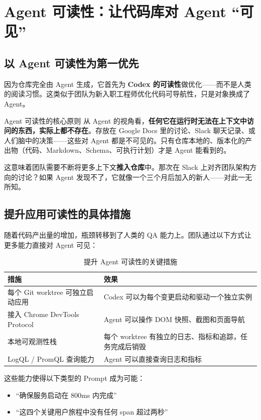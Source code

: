 \section{Agent 可读性：让代码库对 Agent ``可见''}

\subsection{以 Agent 可读性为第一优先}

因为仓库完全由 Agent 生成，它首先为 \textbf{Codex 的可读性}做优化——而不是人类的阅读习惯。这类似于团队为新入职工程师优化代码可导航性，只是对象换成了 Agent。

\begin{importantbox}{Agent 可读性的核心原则}
从 Agent 的视角看，\textbf{任何它在运行时无法在上下文中访问的东西，实际上都不存在}。存放在 Google Docs 里的讨论、Slack 聊天记录、或人们脑中的决策——这些对 Agent 都是不可见的。只有仓库本地的、版本化的产出物（代码、Markdown、Schema、可执行计划）才是 Agent 能看到的。
\end{importantbox}

这意味着团队需要不断将更多上下文\textbf{推入仓库}中。那次在 Slack 上对齐团队架构方向的讨论？如果 Agent 发现不了，它就像一个三个月后加入的新人——对此一无所知。

\subsection{提升应用可读性的具体措施}

随着代码产出量的增加，瓶颈转移到了人类的 QA 能力上。团队通过以下方式让更多能力直接对 Agent 可见：

\begin{table}[H]
\centering
\small
\begin{tabular}{p{4cm}p{9cm}}
\toprule
\textbf{措施} & \textbf{效果} \\
\midrule
每个 Git worktree 可独立启动应用 & Codex 可以为每个变更启动和驱动一个独立实例 \\
接入 Chrome DevTools Protocol & Agent 可以操作 DOM 快照、截图和页面导航 \\
本地可观测性栈 & 每个 worktree 有独立的日志、指标和追踪，任务完成后销毁 \\
LogQL / PromQL 查询能力 & Agent 可以直接查询日志和指标 \\
\bottomrule
\end{tabular}
\caption{提升 Agent 可读性的关键措施}
\end{table}

这些能力使得以下类型的 Prompt 成为可能：
\begin{itemize}[nosep]
  \item ``确保服务启动在 800ms 内完成''
  \item ``这四个关键用户旅程中没有任何 span 超过两秒''
\end{itemize}

